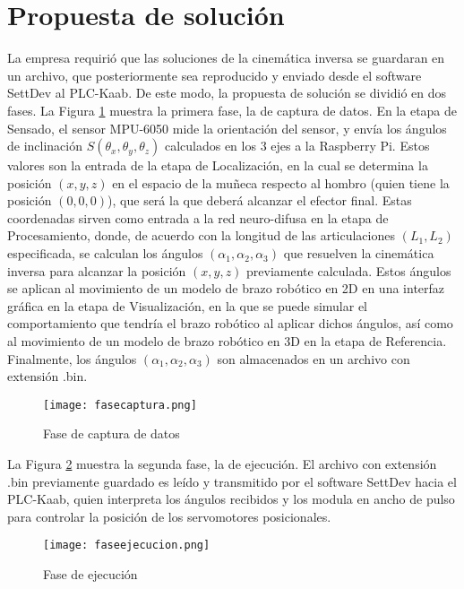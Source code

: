 \section{Propuesta de solución}

La empresa requirió que las soluciones de la cinemática inversa se guardaran en un archivo, que posteriormente sea reproducido y enviado desde el software SettDev al PLC-Kaab. De este modo, la propuesta de solución se dividió en dos fases. La Figura \ref{fig:fasecaptura} muestra la primera fase, la de captura de datos. En la etapa de Sensado, el sensor MPU-6050 mide la orientación del sensor, y envía los ángulos de inclinación $S(\theta_x, \theta_y, \theta_z)$ calculados en los 3 ejes a la Raspberry Pi. Estos valores son la entrada de la etapa de Localización, en la cual se determina la posición $(x, y, z)$ en el espacio de la muñeca respecto al hombro (quien tiene la posición $(0, 0, 0)$), que será la que deberá alcanzar el efector final. Estas coordenadas sirven como entrada a la red neuro-difusa en la etapa de Procesamiento, donde, de acuerdo con la longitud de las articulaciones $(L_1, L_2)$ especificada, se calculan los ángulos $(\alpha_1, \alpha_2, \alpha_3)$ que resuelven la cinemática inversa para alcanzar la posición $(x, y, z)$ previamente calculada. Estos ángulos se aplican al movimiento de un modelo de brazo robótico en 2D en una interfaz gráfica en la etapa de Visualización, en la que se puede simular el comportamiento que tendría el brazo robótico al aplicar dichos ángulos, así como al movimiento de un modelo de brazo robótico en 3D en la etapa de Referencia. Finalmente, los ángulos $(\alpha_1, \alpha_2, \alpha_3)$ son almacenados en un archivo con extensión .bin.

\begin{figure}[htb]
	\centering
	\texttt{[image: fasecaptura.png]}
	\caption{Fase de captura de datos}
	\label{fig:fasecaptura}
\end{figure}

\newpage
La Figura \ref{fig:faseejecucion} muestra la segunda fase, la de ejecución. El archivo con extensión .bin previamente guardado es leído y transmitido por el software SettDev hacia el PLC-Kaab, quien interpreta los ángulos recibidos y los modula en ancho de pulso para controlar la posición de los servomotores posicionales.

\begin{figure}[htb]
	\centering
	\texttt{[image: faseejecucion.png]}
	\caption{Fase de ejecución}
	\label{fig:faseejecucion}
\end{figure}